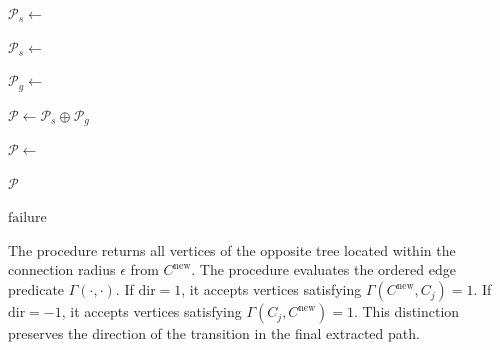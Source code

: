 \documentclass{pas}
\begin{document}
\begin{algorithm}[t]
\begin{algorithmic}[1]
    \State $\mathcal{P}_s\gets$

    \State $\mathcal{P}_s\gets$

    \State $\mathcal{P}_g\gets$

    \State $\mathcal{P}\gets\mathcal{P}_s\oplus\mathcal{P}_g$

    \State $\mathcal{P}\gets$

    \State \Return $\mathcal{P}$

\EndFor

\State \Return $\mathrm{failure}$

\end{algorithmic}
\end{algorithm}

The procedure  returns all vertices of the opposite tree located
within the connection radius \(\epsilon\) from \(C^{\mathrm{new}}\). The
procedure  evaluates the ordered edge predicate
\(\Gamma(\cdot,\cdot)\). If \(\mathrm{dir}=1\), it accepts vertices satisfying
\(\Gamma(C^{\mathrm{new}},C_j)=1\). If \(\mathrm{dir}=-1\), it accepts vertices
satisfying \(\Gamma(C_j,C^{\mathrm{new}})=1\). This distinction preserves the
direction of the transition in the final extracted path.
\end{document}
